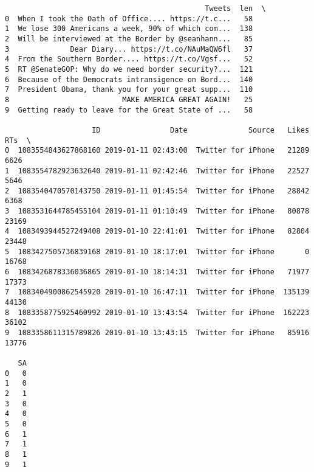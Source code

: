 \documentclass[11pt]{article}
\begin{document}
    
    \begin{verbatim}
                                              Tweets  len  \
0  When I took the Oath of Office.... https://t.c...   58   
1  We lose 300 Americans a week, 90% of which com...  138   
2  Will be interviewed at the Border by @seanhann...   85   
3              Dear Diary... https://t.co/NAuMaQW6fl   37   
4  From the Southern Border.... https://t.co/Vgsf...   52   
5  RT @SenateGOP: Why do we need border security?...  121   
6  Because of the Democrats intransigence on Bord...  140   
7  President Obama, thank you for your great supp...  110   
8                          MAKE AMERICA GREAT AGAIN!   25   
9  Getting ready to leave for the Great State of ...   58   

                    ID                Date              Source   Likes    RTs  \
0  1083554843627868160 2019-01-11 02:43:00  Twitter for iPhone   21289   6626   
1  1083554782923632640 2019-01-11 02:42:46  Twitter for iPhone   22527   5646   
2  1083540470570143750 2019-01-11 01:45:54  Twitter for iPhone   28842   6368   
3  1083531644785455104 2019-01-11 01:10:49  Twitter for iPhone   80878  23169   
4  1083493944527249408 2019-01-10 22:41:01  Twitter for iPhone   82804  23448   
5  1083427505736839168 2019-01-10 18:17:01  Twitter for iPhone       0  16768   
6  1083426878336036865 2019-01-10 18:14:31  Twitter for iPhone   71977  17373   
7  1083404900862545920 2019-01-10 16:47:11  Twitter for iPhone  135139  44130   
8  1083358775925460992 2019-01-10 13:43:54  Twitter for iPhone  162223  36102   
9  1083358611315789826 2019-01-10 13:43:15  Twitter for iPhone   85916  13776   

   SA  
0   0  
1   0  
2   1  
3   0  
4   0  
5   0  
6   1  
7   1  
8   1  
9   1  
    \end{verbatim}
\end{document}
